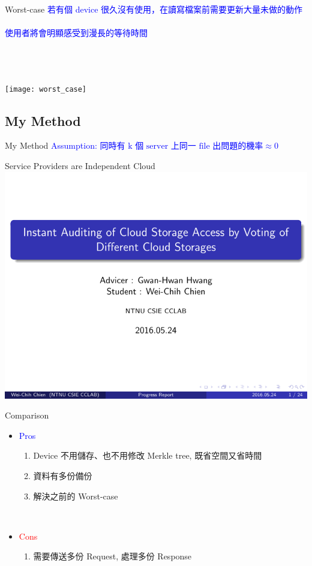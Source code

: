 \documentclass{beamer}
\begin{document}
\begin{CJK}{UTF8}{bkai}
\begin{frame}{Worst-case}
	\textcolor{blue}{若有個 device 很久沒有使用，在讀寫檔案前需要更新大量未做的動作\\
	~\\
	使用者將會明顯感受到漫長的等待時間}\\
	~\\
	~\\
	~\\
	\begin{center}
		\texttt{[image: worst\_case]}
	\end{center}
\end{frame}

\subsection{\small{My Method}}
\begin{frame}{My Method}
	\textcolor{blue}{Assumption: $\text{同時有 k 個 server 上同一 file 出問題的機率} \approx 0$}
	\begin{center}
		\alert{Service Providers are Independent Cloud}
		\includegraphics[width=.7\textwidth]{wei_chih}
	\end{center}
\end{frame}

\begin{frame}{Comparison}
	\begin{itemize}
		\item \textcolor{blue}{Pros}
			\begin{enumerate}
				\item Device 不用儲存、也不用修改 Merkle tree, 既省空間又省時間
				\item 資料有多份備份
				\item 解決之前的 Worst-case
			\end{enumerate}
		~\\
		\item \textcolor{red}{Cons}
			\begin{enumerate}
				\item 需要傳送多份 Request, 處理多份 Response
			\end{enumerate}
	\end{itemize}
\end{frame}


\end{CJK}
\end{document}
